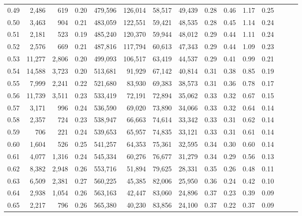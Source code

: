 \begin{tabular}{rrrrrrrrrrrrrrr}
0.49 &   2,486 &    619 &  0.20 &  479,596 &  126,014 &   58,517 &   49,439 &  0.28 &  0.46 &  1.17 &      0.25 \\
0.50 &   3,463 &    904 &  0.21 &  483,059 &  122,551 &   59,421 &   48,535 &  0.28 &  0.45 &  1.14 &      0.24 \\
0.51 &   2,181 &    523 &  0.19 &  485,240 &  120,370 &   59,944 &   48,012 &  0.29 &  0.44 &  1.11 &      0.24 \\
0.52 &   2,576 &    669 &  0.21 &  487,816 &  117,794 &   60,613 &   47,343 &  0.29 &  0.44 &  1.09 &      0.23 \\
0.53 &  11,277 &  2,806 &  0.20 &  499,093 &  106,517 &   63,419 &   44,537 &  0.29 &  0.41 &  0.99 &      0.21 \\
0.54 &  14,588 &  3,723 &  0.20 &  513,681 &   91,929 &   67,142 &   40,814 &  0.31 &  0.38 &  0.85 &      0.19 \\
0.55 &   7,999 &  2,241 &  0.22 &  521,680 &   83,930 &   69,383 &   38,573 &  0.31 &  0.36 &  0.78 &      0.17 \\
0.56 &  11,739 &  3,511 &  0.23 &  533,419 &   72,191 &   72,894 &   35,062 &  0.33 &  0.32 &  0.67 &      0.15 \\
0.57 &   3,171 &    996 &  0.24 &  536,590 &   69,020 &   73,890 &   34,066 &  0.33 &  0.32 &  0.64 &      0.14 \\
0.58 &   2,357 &    724 &  0.23 &  538,947 &   66,663 &   74,614 &   33,342 &  0.33 &  0.31 &  0.62 &      0.14 \\
0.59 &     706 &    221 &  0.24 &  539,653 &   65,957 &   74,835 &   33,121 &  0.33 &  0.31 &  0.61 &      0.14 \\
0.60 &   1,604 &    526 &  0.25 &  541,257 &   64,353 &   75,361 &   32,595 &  0.34 &  0.30 &  0.60 &      0.14 \\
0.61 &   4,077 &  1,316 &  0.24 &  545,334 &   60,276 &   76,677 &   31,279 &  0.34 &  0.29 &  0.56 &      0.13 \\
0.62 &   8,382 &  2,948 &  0.26 &  553,716 &   51,894 &   79,625 &   28,331 &  0.35 &  0.26 &  0.48 &      0.11 \\
0.63 &   6,509 &  2,381 &  0.27 &  560,225 &   45,385 &   82,006 &   25,950 &  0.36 &  0.24 &  0.42 &      0.10 \\
0.64 &   2,938 &  1,054 &  0.26 &  563,163 &   42,447 &   83,060 &   24,896 &  0.37 &  0.23 &  0.39 &      0.09 \\
0.65 &   2,217 &    796 &  0.26 &  565,380 &   40,230 &   83,856 &   24,100 &  0.37 &  0.22 &  0.37 &      0.09 \\

\end{tabular}
